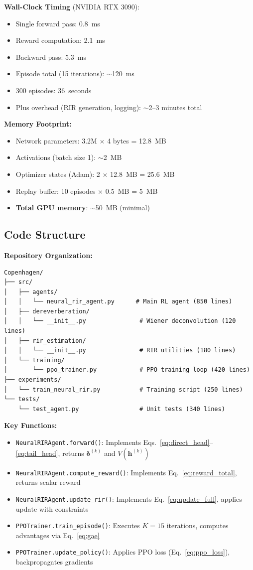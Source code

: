 \documentclass[12pt,a4paper]{article}
\begin{document}
\textbf{Wall-Clock Timing} (NVIDIA RTX 3090):
\begin{itemize}
\item Single forward pass: 0.8~ms
\item Reward computation: 2.1~ms
\item Backward pass: 5.3~ms
\item Episode total (15 iterations): $\sim$120~ms
\item 300 episodes: 36~seconds
\item Plus overhead (RIR generation, logging): $\sim$2--3 minutes total
\end{itemize}

\textbf{Memory Footprint:}
\begin{itemize}
\item Network parameters: 3.2M $\times$ 4 bytes = 12.8~MB
\item Activations (batch size 1): $\sim$2~MB
\item Optimizer states (Adam): 2 $\times$ 12.8~MB = 25.6~MB
\item Replay buffer: 10 episodes $\times$ 0.5~MB = 5~MB
\item \textbf{Total GPU memory}: $\sim$50~MB (minimal)
\end{itemize}

\subsection{Code Structure}

\textbf{Repository Organization:}
\begin{verbatim}
Copenhagen/
├── src/
│   ├── agents/
│   │   └── neural_rir_agent.py      # Main RL agent (850 lines)
│   ├── dereverberation/
│   │   └── __init__.py               # Wiener deconvolution (120 lines)
│   ├── rir_estimation/
│   │   └── __init__.py               # RIR utilities (180 lines)
│   └── training/
│       └── ppo_trainer.py            # PPO training loop (420 lines)
├── experiments/
│   └── train_neural_rir.py           # Training script (250 lines)
└── tests/
    └── test_agent.py                 # Unit tests (340 lines)
\end{verbatim}

\textbf{Key Functions:}
\begin{itemize}
\item \texttt{NeuralRIRAgent.forward()}: Implements Eqs.~\ref{eq:direct_head}--\ref{eq:tail_head}, returns $\boldsymbol{\delta}^{(k)}$ and $V(\mathbf{h}^{(k)})$
\item \texttt{NeuralRIRAgent.compute\_reward()}: Implements Eq.~\ref{eq:reward_total}, returns scalar reward
\item \texttt{NeuralRIRAgent.update\_rir()}: Implements Eq.~\ref{eq:update_full}, applies update with constraints
\item \texttt{PPOTrainer.train\_episode()}: Executes $K=15$ iterations, computes advantages via Eq.~\ref{eq:gae}
\item \texttt{PPOTrainer.update\_policy()}: Applies PPO loss (Eq.~\ref{eq:ppo_loss}), backpropagates gradients
\end{itemize}
\end{document}
